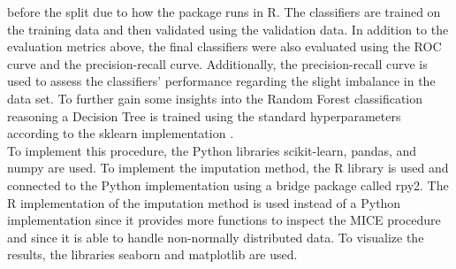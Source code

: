 before the split 
due to how the  package runs in R. The classifiers are 
trained on the training data and then validated using the validation data. 
In addition to the evaluation metrics above, the final classifiers were also 
evaluated using the ROC curve and the precision-recall curve. Additionally, the 
precision-recall curve is used to assess the classifiers' performance 
regarding the slight imbalance in the data set. To further gain some insights 
into the Random Forest classification reasoning a Decision 
Tree is 
trained using the standard hyperparameters according to the sklearn 
implementation \cite{RN191}.
\\
To implement this procedure, the Python libraries scikit-learn, pandas, and 
numpy are used. To implement the imputation method, the R library  
is used and connected to the Python implementation using a bridge package 
called rpy2. The R implementation of the imputation method is used instead of a 
Python implementation since it provides more functions to inspect the MICE 
procedure and since it is able to handle non-normally distributed data. To 
visualize the results, the libraries seaborn and matplotlib are used.

